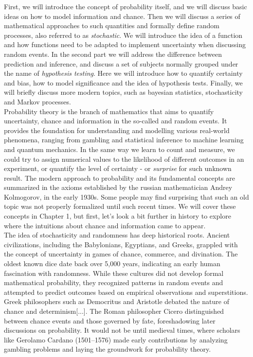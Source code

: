 \documentclass{book}
\begin{document}
First, we will introduce the concept of probability itself, and we will discuss basic ideas on how to model information and chance. Then we will discuss a series of mathematical approaches to such quantities and formally define random processes, also referred to as \textit{stochastic}. We will introduce the idea of a function and how functions need to be adapted to implement uncertainty when discussing random events. In the second part we will address the difference between prediction and inference, and discuss a set of subjects normally grouped under the name of \textit{hypothesis testing}. Here we will introduce how to quantify certainty and bias, how to model significance and the idea of hypothesis tests. Finally, we will briefly discuss more modern topics, such as bayesian statistics, stochasticity and Markov processes.\\

Probability theory is the branch of mathematics that aims to quantify uncertainty, chance and information in the so-called and random events. It provides the foundation for understanding and modelling various real-world phenomena, ranging from gambling and statistical inference to machine learning and quantum mechanics. In the same way we learn to count and measure, we could try to assign numerical values to the likelihood of different outcomes in an experiment, or quantify the level of certainty - or \textit{surprise} for such unknown result. The modern approach to probability and its fundamental concepts are summarized in the axioms established by the russian mathematician Andrey Kolmogorov, in the early 1930s. Some people may find surprising that such an old topic was not properly formalized until such recent times. We will cover these concepts in Chapter 1, but first, let's look a bit further in history to explore where the intuitions about chance and information came to appear.\\

The idea of stochasticity and randomness has deep historical roots. Ancient civilizations, including the Babylonians, Egyptians, and Greeks, grappled with the concept of uncertainty in games of chance, commerce, and divination. The oldest known dice date back over 5,000 years, indicating an early human fascination with randomness. While these cultures did not develop formal mathematical probability, they recognized patterns in random events and attempted to predict outcomes based on empirical observations and superstitions.\\
\indent Greek philosophers such as Democritus and Aristotle debated the nature of chance and determinism[...]. The Roman philosopher Cicero distinguished between chance events and those governed by fate, foreshadowing later discussions on probability. It would not be until medieval times, where scholars like Gerolamo Cardano (1501–1576) made early contributions by analyzing gambling problems and laying the groundwork for probability theory.\\
\end{document}
